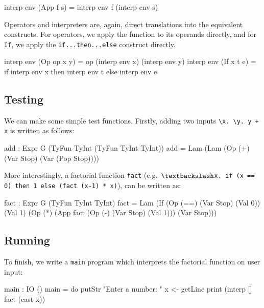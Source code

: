\begin{code}
interp env (App f s) = interp env f (interp env s)
\end{code}

\noindent
Operators and interpreters are, again, direct translations into the equivalent \Idris{} constructs.
For operators, we apply the function to its operands directly, and for \texttt{If}, we apply the \Idris{} \texttt{if...then...else} construct directly.

\begin{code}
interp env (Op op x y) = op (interp env x) (interp env y)
interp env (If x t e)  = if interp env x then interp env t
                                         else interp env e
\end{code}

\subsection{Testing}
\label{sec:interp:testing}

We can make some simple test functions.
Firstly, adding two inputs \verb!\x. \y. y + x! is written as follows:

\begin{code}
add : Expr G (TyFun TyInt (TyFun TyInt TyInt))
add = Lam (Lam (Op (+) (Var Stop) (Var (Pop Stop))))
\end{code}

\noindent
More interestingly, a factorial function \texttt{fact} (e.g.\ \texttt{$\textbackslash$x. if (x == 0) then 1 else (fact (x-1) * x)}), can be written as:

\begin{code}
fact : Expr G (TyFun TyInt TyInt)
fact = Lam (If (Op (==) (Var Stop) (Val 0))
               (Val 1)
               (Op (*) (App fact (Op (-) (Var Stop) (Val 1)))
                       (Var Stop)))
\end{code}

\subsection{Running}
\label{sec:interp:running}

To finish, we write a \texttt{main} program which interprets the factorial function on user input:

\begin{code}
main : IO ()
main = do putStr "Enter a number: "
          x <- getLine
          print (interp [] fact (cast x))
\end{code}

